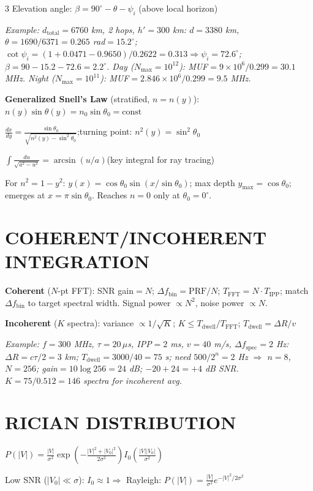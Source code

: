 \documentclass[6pt,landscape]{article}
\begin{document}
\begin{multicols}{3}
Elevation angle: $\beta=90^\circ-\theta-\psi_i$ (above local horizon)

\textit{Example: $d_\text{total}=6760$ km, 2 hops, $h'=300$ km: $d=3380$ km, $\theta=1690/6371=0.265$ rad$=15.2^\circ$; $\cot\psi_i=(1+0.0471-0.9650)/0.2622=0.313\Rightarrow\psi_i=72.6^\circ$; $\beta=90-15.2-72.6=2.2^\circ$.
Day ($N_\text{max}=10^{12}$): MUF$=9\times10^6/0.299=30.1$ MHz.
Night ($N_\text{max}=10^{11}$): MUF$=2.846\times10^6/0.299=9.5$ MHz.}

\textbf{Generalized Snell's Law} (stratified, $n=n(y)$):
$n(y)\sin\theta(y)=n_0\sin\theta_0=\text{const}$

$\frac{dx}{dy}=\frac{\sin\theta_0}{\sqrt{n^2(y)-\sin^2\theta_0}}$;\quad turning point: $n^2(y)=\sin^2\theta_0$

$\int\frac{du}{\sqrt{a^2-u^2}}=\arcsin(u/a)$\quad (key integral for ray tracing)

For $n^2=1-y^2$: $y(x)=\cos\theta_0\sin(x/\sin\theta_0)$; max depth $y_\text{max}=\cos\theta_0$; emerges at $x=\pi\sin\theta_0$. Reaches $n=0$ only at $\theta_0=0^\circ$.

\columnbreak

\section*{COHERENT/INCOHERENT INTEGRATION}
\textbf{Coherent} ($N$-pt FFT): SNR gain$=N$; $\Delta f_\text{bin}=\text{PRF}/N$; $T_\text{FFT}=N\cdot T_\text{IPP}$; match $\Delta f_\text{bin}$ to target spectral width. Signal power $\propto N^2$, noise power $\propto N$.

\textbf{Incoherent} ($K$ spectra): variance $\propto1/\sqrt{K}$; $K\leq T_\text{dwell}/T_\text{FFT}$; $T_\text{dwell}=\Delta R/v$

\textit{Example: $f=300$ MHz, $\tau=20\,\mu$s, IPP$=2$ ms, $v=40$ m/s, $\Delta f_\text{spec}=2$ Hz:
$\Delta R=c\tau/2=3$ km; $T_\text{dwell}=3000/40=75$ s; need $500/2^n=2$ Hz $\Rightarrow$ $n=8$, $N=256$; gain$=10\log256=24$ dB; $-20+24=+4$ dB SNR. $K=75/0.512=146$ spectra for incoherent avg.}

\section*{RICIAN DISTRIBUTION}
$P(|V|)=\frac{|V|}{\sigma^2}\exp\!\!\left(-\frac{|V|^2+|V_0|^2}{2\sigma^2}\right)\!I_0\!\!\left(\frac{|V||V_0|}{\sigma^2}\right)$

Low SNR ($|V_0|\ll\sigma$): $I_0\approx1\Rightarrow$ Rayleigh: $P(|V|)=\frac{|V|}{\sigma^2}e^{-|V|^2/2\sigma^2}$


\end{multicols}
\end{document}
